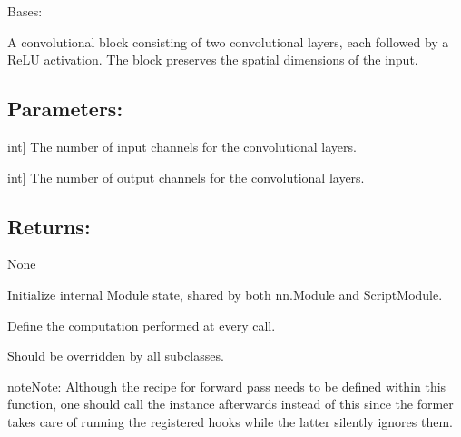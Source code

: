 \documentclass[a4paper,10pt,english]{sphinxmanual}
\begin{document}
\begin{fulllineitems}
\label{\detokenize{models:fireDiff.Models.unet_predictor.ConvBlock}}
\pysigstartsignatures
{}
\pysigstopsignatures
\sphinxAtStartPar
Bases: 

\sphinxAtStartPar
A convolutional block consisting of two convolutional layers, each
followed by a ReLU activation. The block preserves the spatial dimensions
of the input.


\subsection{Parameters:}
\label{\detokenize{models:id16}}\begin{description}
\sphinxlineitem{in\_channels}{[}int{]}
\sphinxAtStartPar
The number of input channels for the convolutional layers.

\sphinxlineitem{out\_channels}{[}int{]}
\sphinxAtStartPar
The number of output channels for the convolutional layers.

\end{description}


\subsection{Returns:}
\label{\detokenize{models:id17}}
\sphinxAtStartPar
None

\sphinxAtStartPar
Initialize internal Module state, shared by both nn.Module and ScriptModule.

\begin{fulllineitems}
\label{\detokenize{models:fireDiff.Models.unet_predictor.ConvBlock.forward}}
\pysigstartsignatures
{}
\pysigstopsignatures
\sphinxAtStartPar
Define the computation performed at every call.

\sphinxAtStartPar
Should be overridden by all subclasses.

\begin{sphinxadmonition}{note}{Note:}
\sphinxAtStartPar
Although the recipe for forward pass needs to be defined within
this function, one should call the  instance afterwards
instead of this since the former takes care of running the
registered hooks while the latter silently ignores them.
\end{sphinxadmonition}

\end{fulllineitems}


\end{fulllineitems}
\end{document}
